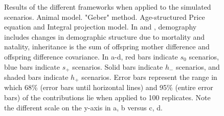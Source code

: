 \begin{figure}
\caption{Results of the different frameworks when applied to the simulated scenarios.  Animal model.  "Geber" method.  Age-structured Price equation and  Integral projection model. In  and , demography includes changes in demographic structure due to mortality and natality, inheritance is the sum of offspring mother difference and offspring difference covariance. In a-d, red bars indicate $s_0$ scenarios, blue bars indicate $s_+$ scenarios. Solid bars indicate $h_{-}$ scenarios, and shaded bars indicate $h_{+}$ scenarios. Error bars represent the range in which 68\% (error bars until horizontal lines) and 95\% (entire error bars) of the contributions lie when applied to 100 replicates. Note the different scale on the y-axis in a, b versus c, d.}
\label{frameworkresults}
\end{figure}


\printbibliography[heading=subbibliography]
